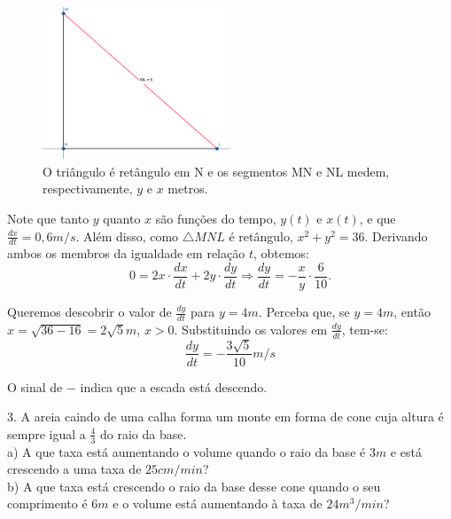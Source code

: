 \documentclass{article}
\begin{document}
{\begin{newpage}
\begin{figure}[htbp]
\begin{center}
\includegraphics[width=0.5\textwidth, angle=0]{Escada.png}
\end{center}
\caption{O triângulo é retângulo em N e os segmentos MN e NL medem, respectivamente, $y$ e $x$ metros.}
\end{figure}
\par Note que tanto $y$ quanto $x$ são funções do tempo, $y(t)$ e $x(t)$, e que $\displaystyle{\frac{dx}{dt} = 0,6m/s}$. Além disso, como $\triangle MNL$ é retângulo, $x^2 + y^2 = 36$. Derivando ambos os membros da igualdade em relação $t$, obtemos:
\begin{equation*} \displaystyle{0 = 2x\cdot\frac{dx}{dt} + 2y\cdot\frac{dy}{dt} \Rightarrow \frac{dy}{dt} = -\frac{x}{y}\cdot\frac{6}{10}}. \end{equation*}
\par Queremos descobrir o valor de $\displaystyle{\frac{dy}{dt}}$ para $y=4m$. Perceba que, se $y=4m$, então $x=\sqrt{36-16} = 2\sqrt{5}m$, $x>0$. Substituindo os valores em $\displaystyle{\frac{dy}{dt}}$, tem-se:
$$\displaystyle{\frac{dy}{dt} = -\frac{3\sqrt{5}}{10}m/s}$$
\par O sinal de $-$ indica que a escada está descendo.
\par
\vspace{0.3cm}
\begin{flushleft}
3. A areia caindo de uma calha forma um monte em forma de cone cuja altura é sempre igual a $\displaystyle{\frac{4}{3}}$ do raio da base.\\
\hspace{12pt}a) A que taxa está aumentando o volume quando o raio da base é $3m$ e está crescendo a uma taxa de $25cm/min$?\\
\hspace{12pt}b) A que taxa está crescendo o raio da base desse cone quando o seu comprimento é $6m$ e o volume está aumentando à taxa de $24m^{3}/min$?
\end{flushleft}

\end{newpage}}
\end{document}

